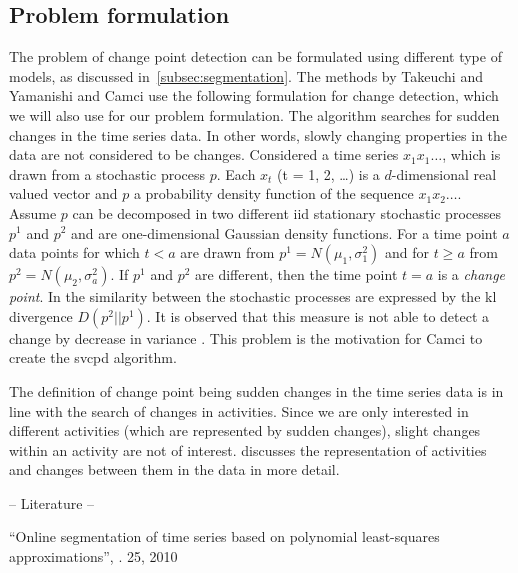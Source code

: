 \subsection{Problem formulation}\label{subsec:change_detection_problem_formulation}
The problem of change point detection can be formulated using different type of models, as discussed in~\ref{subsec:segmentation}.
The methods by Takeuchi and Yamanishi \cite{takeuchi2006unifying} and Camci \cite{camci2010change} use the following formulation for change detection, which we will also use for our problem formulation.
The algorithm searches for sudden changes in the time series data.
In other words, slowly changing properties in the data are not considered to be changes.
Considered a time series $x_1 x_1 \dots$, which is drawn from a stochastic process $p$.
Each $x_t$ (t = 1, 2, \dots) is a $d$-dimensional real valued vector and $p$ a probability density function of the sequence $x_1 x_2 \dots$.
Assume $p$ can be decomposed in two different \gls{iid} stationary stochastic processes $p^1$ and $p^2$ and are one-dimensional Gaussian density functions.
For a time point $a$ data points for which $t < a$ are drawn from $p^1 = N(\mu_1, \sigma_1^2)$ and for $t \geq a$ from $p^2 = N(\mu_2, \sigma_a^2)$.
If $p^1$ and $p^2$ are different, then the time point $t = a$ is a \emph{change point}.
In \cite{takeuchi2006unifying} the similarity between the stochastic processes are expressed by the \gls{kl} divergence $D(p^2||p^1)$.
It is observed that this measure is not able to detect a change by decrease in variance \cite{takeuchi2006unifying,camci2010change}.
This problem is the motivation for Camci \cite{camci2010change} to create the \gls{svcpd} algorithm.

The definition of change point being sudden changes in the time series data is in line with the search of changes in activities.
Since we are only interested in different activities (which are represented by sudden changes), slight changes within an activity are not of interest.
 discusses the representation of activities and changes between them in the data in more detail.


-- Literature --

``Online segmentation of time series based on polynomial least-squares approximations'', \cite{fuchs2010online}. 25, 2010 \\


